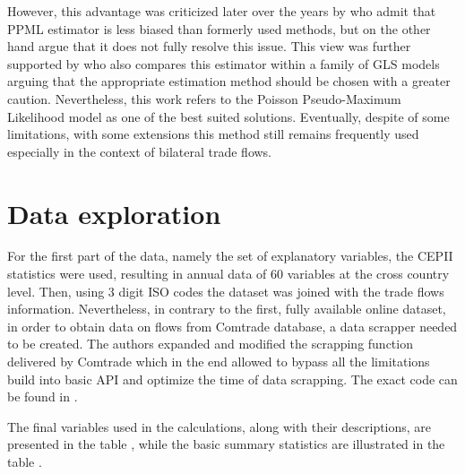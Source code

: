 \documentclass{Trade_template}
\numberwithin{equation}{section}
\begin{document}
However, this advantage was criticized later over the years by \citet{martin2008gravity} who admit that PPML estimator is less biased than formerly used methods, but on the other hand argue that it does not fully resolve this issue. This view was further supported by \citet{martinez2013gravity} who also compares this estimator within a family of GLS models arguing that the appropriate estimation method should be chosen with a greater caution. Nevertheless,  this work refers to the Poisson Pseudo-Maximum Likelihood model as one of the best suited solutions. Eventually, despite of some limitations, with some extensions this method still remains frequently used especially in the context of bilateral trade flows.


\chapter{Data exploration}

For the first part of the data, namely the set of explanatory variables, the CEPII statistics were used, resulting in annual data of 60 variables at the cross country level. Then, using 3 digit ISO codes the dataset was joined with the trade flows information. Nevertheless, in contrary to the first, fully available online dataset, in order to obtain data on flows from Comtrade database, a data scrapper needed to be created. The authors expanded and modified the scrapping function delivered by Comtrade which in the end allowed to bypass all the limitations build into basic API and optimize the time of data scrapping. The exact code can be found in . 

The final variables used in the calculations, along with their descriptions, are presented in the table , while the basic summary statistics are illustrated in the table .

\newpage 
\end{document}
